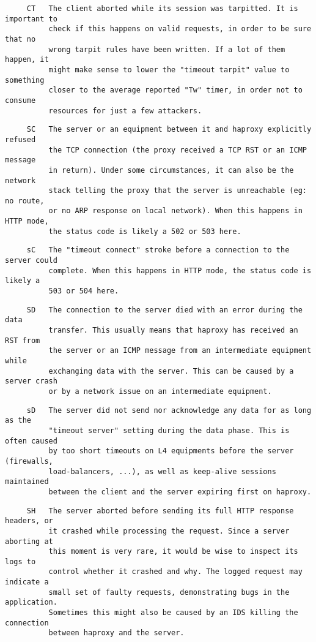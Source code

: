 \begin{verbatim}
     CT   The client aborted while its session was tarpitted. It is important to
          check if this happens on valid requests, in order to be sure that no
          wrong tarpit rules have been written. If a lot of them happen, it
          might make sense to lower the "timeout tarpit" value to something
          closer to the average reported "Tw" timer, in order not to consume
          resources for just a few attackers.
\end{verbatim}

\begin{verbatim}
     SC   The server or an equipment between it and haproxy explicitly refused
          the TCP connection (the proxy received a TCP RST or an ICMP message
          in return). Under some circumstances, it can also be the network
          stack telling the proxy that the server is unreachable (eg: no route,
          or no ARP response on local network). When this happens in HTTP mode,
          the status code is likely a 502 or 503 here.
\end{verbatim}

\begin{verbatim}
     sC   The "timeout connect" stroke before a connection to the server could
          complete. When this happens in HTTP mode, the status code is likely a
          503 or 504 here.
\end{verbatim}

\begin{verbatim}
     SD   The connection to the server died with an error during the data
          transfer. This usually means that haproxy has received an RST from
          the server or an ICMP message from an intermediate equipment while
          exchanging data with the server. This can be caused by a server crash
          or by a network issue on an intermediate equipment.
\end{verbatim}

\begin{verbatim}
     sD   The server did not send nor acknowledge any data for as long as the
          "timeout server" setting during the data phase. This is often caused
          by too short timeouts on L4 equipments before the server (firewalls,
          load-balancers, ...), as well as keep-alive sessions maintained
          between the client and the server expiring first on haproxy.
\end{verbatim}

\begin{verbatim}
     SH   The server aborted before sending its full HTTP response headers, or
          it crashed while processing the request. Since a server aborting at
          this moment is very rare, it would be wise to inspect its logs to
          control whether it crashed and why. The logged request may indicate a
          small set of faulty requests, demonstrating bugs in the application.
          Sometimes this might also be caused by an IDS killing the connection
          between haproxy and the server.
\end{verbatim}

